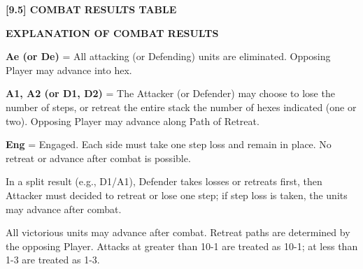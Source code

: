 \par

\textbf{[9.5] COMBAT RESULTS TABLE}


\begin{flushleft}
  \textbf{EXPLANATION OF COMBAT RESULTS}
\end{flushleft}

\textbf{Ae (or De)} = All attacking (or Defending) units are eliminated. Opposing Player may advance into hex.
\par
\textbf{A1, A2 (or D1, D2)} = The Attacker (or Defender) may choose to lose the number of steps, or retreat the entire stack the number of hexes indicated (one or two). Opposing Player may advance along Path of Retreat.
\par
\textbf{Eng} = Engaged. Each side must take one step loss and remain in place. No retreat or advance after combat is possible.
\par
In a split result (e.g., D1/A1), Defender takes losses or retreats first, then Attacker must decided to retreat or lose one step; if step loss is taken, the units may advance after combat.
\par
All victorious units may advance after combat. Retreat paths are determined by the opposing Player. Attacks at greater than 10-1 are treated as 10-1; at less than 1-3 are treated as 1-3.